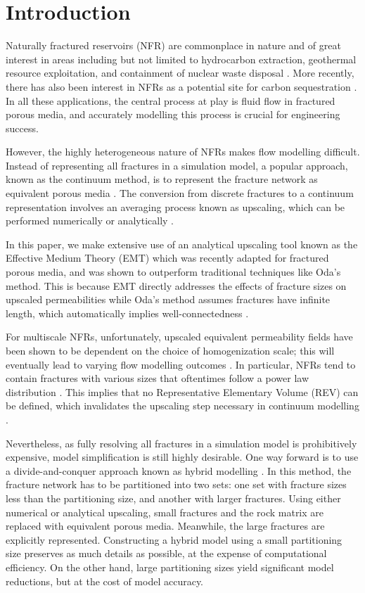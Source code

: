 \documentclass[a4paper]{article}
\begin{document}
\section{Introduction}
Naturally fractured reservoirs (NFR) are commonplace in nature and of great interest in areas including but not limited to hydrocarbon extraction, geothermal resource exploitation, and containment of nuclear waste disposal \citep{Berkowitz2002}. More recently, there has also been 
interest in NFRs as a potential site for carbon sequestration \citep{March2018}. In all these applications, the central process at play is fluid flow in fractured porous media, and accurately modelling this process is crucial for engineering success.

However, the highly heterogeneous nature of NFRs makes flow modelling difficult. Instead of representing all fractures in a simulation model, a popular approach, known as the continuum method, is to represent the fracture network as equivalent porous media \citep{Ezulike2013, Warren1963, Yan2016}. The conversion from discrete fractures to a continuum representation involves an averaging process known as upscaling, which can be performed numerically or analytically \citep{Durlofsky1991,Oda1985,Renard1997,Saevik2013}. 

In this paper, we make extensive use of an analytical upscaling tool known as the Effective Medium Theory (EMT) which was recently adapted for fractured porous media, and was shown to outperform traditional techniques like Oda's method. This is because EMT directly addresses the effects of fracture sizes on upscaled permeabilities while Oda's method assumes fractures have infinite length, which automatically implies well-connectedness \citep{Oda1985, Saevik2013, Saevik2014}.

For multiscale NFRs, unfortunately, upscaled equivalent permeability fields have been shown to be dependent on the choice of homogenization scale; this will eventually lead to varying flow modelling outcomes \citep{Elfeel2013}. In particular, NFRs tend to contain fractures with various sizes that oftentimes follow a power law distribution \citep{Bonnet2001}. This implies that no Representative Elementary Volume (REV) can be defined, which invalidates the upscaling step necessary in continuum modelling \citep{Berkowitz2002}.

Nevertheless, as fully resolving all fractures in a simulation model is prohibitively expensive, model simplification is still highly desirable. One way forward is to use a divide-and-conquer approach known as hybrid modelling \citep{Berkowitz2002}. In this method, the fracture network has to be partitioned into two sets: one set with fracture sizes less than the partitioning size, and another with larger fractures. Using either numerical or analytical upscaling, small fractures and the rock matrix are replaced with equivalent porous media. Meanwhile, the large fractures are explicitly represented. Constructing a hybrid model using a small partitioning size preserves as much details as possible, at the expense of computational efficiency. On the other hand, large partitioning sizes yield significant model reductions, but at the cost of model accuracy.
\end{document}
